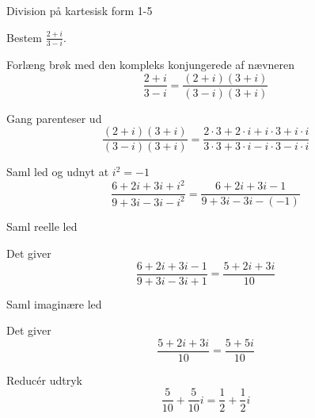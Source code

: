 \documentclass{article}
\begin{document}
\begin{exercise}{Division på kartesisk form 1-5}
	
	Bestem $\frac{2+i}{3-i}$.
	
	
	
	\hint 
	
	Forlæng brøk med den kompleks konjungerede af nævneren
	\[
	\frac{2+i}{3-i} = \frac{(2+i)(3+i)}{(3-i)(3+i)}
	\]
	
	\hint
	
	Gang parenteser ud
	\[
	\frac{(2+i)(3+i)}{(3-i)(3+i)} = \frac{2 \cdot 3 + 2 \cdot i + i \cdot 3 +i \cdot i}{3 \cdot 3 + 3 \cdot i -i \cdot 3 -i \cdot i}
	\]
	
	\hint 
	
	Saml led og udnyt at $i^2 = -1$
	\[
	\frac{6+2i+3i+i^2}{9 + 3i -3i -i^2} = \frac{6+2i+3i-1}{9 + 3i -3i -(-1)}
	\]
	
	\hint
	
	Saml reelle led
	
	\hint
	
	Det giver
	\[
	\frac{6+2i+3i-1}{9 + 3i -3i +1} = \frac{5 + 2i +3i}{10}
	\]
	
	\hint
	
	Saml imaginære led
	
	
	\hint
	
	Det giver 
	\[
	\frac{5 + 2i +3i}{10} = \frac{5+5i}{10}
	\]
	
	\hint
	
	Reducér udtryk
	\[
	\frac{5}{10}+\frac{5}{10}i = \frac{1}{2}+\frac{1}{2}i 
	\]
	
\end{exercise}

\newpage
\end{document}
